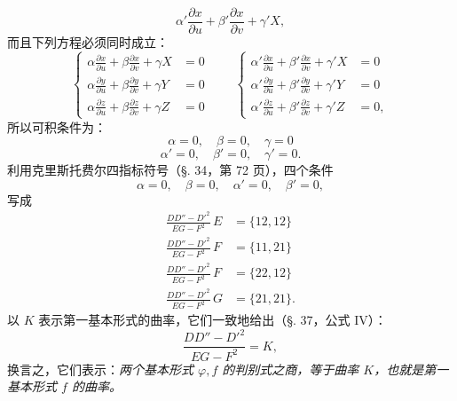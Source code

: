 \[
 \alpha'\frac{\partial x}{\partial u}+\beta'\frac{\partial x}{\partial v}+\gamma'X,
\]
而且下列方程必须同时成立：
\[
\left\{
\begin{aligned}
 \alpha\frac{\partial x}{\partial u}+\beta\frac{\partial x}{\partial v}+\gamma X&=0\\
 \alpha\frac{\partial y}{\partial u}+\beta\frac{\partial y}{\partial v}+\gamma Y&=0\\
 \alpha\frac{\partial z}{\partial u}+\beta\frac{\partial z}{\partial v}+\gamma Z&=0
\end{aligned}\right.
\qquad
\left\{
\begin{aligned}
 \alpha'\frac{\partial x}{\partial u}+\beta'\frac{\partial x}{\partial v}+\gamma'X&=0\\
 \alpha'\frac{\partial y}{\partial u}+\beta'\frac{\partial y}{\partial v}+\gamma'Y&=0\\
 \alpha'\frac{\partial z}{\partial u}+\beta'\frac{\partial z}{\partial v}+\gamma'Z&=0,
\end{aligned}\right.
\]
所以可积条件为：
\[
 \alpha=0,\quad \beta=0,\quad \gamma=0
\]
\[
 \alpha'=0,\quad \beta'=0,\quad \gamma'=0.
\]
利用克里斯托费尔四指标符号（\S. 34，第 72 页），四个条件
\[
 \alpha=0,\quad \beta=0,\quad \alpha'=0,\quad \beta'=0,
\]
写成
\[
\begin{aligned}
 \frac{DD''-D'^2}{EG-F^2}\,E&=\{12,12\}\\
 \frac{DD''-D'^2}{EG-F^2}\,F&=\{11,21\}\\
 \frac{DD''-D'^2}{EG-F^2}\,F&=\{22,12\}\\
 \frac{DD''-D'^2}{EG-F^2}\,G&=\{21,21\}.
\end{aligned}
\]
以 \(K\) 表示第一基本形式的曲率，它们一致地给出（\S. 37，公式 IV）：
\begin{equation}\tag{III}
 \frac{DD''-D'^2}{EG-F^2}=K,
\end{equation}
换言之，它们表示：\emph{两个基本形式 \(\varphi,f\) 的判别式之商，等于曲率 \(K\)，也就是第一基本形式 \(f\) 的曲率。}

